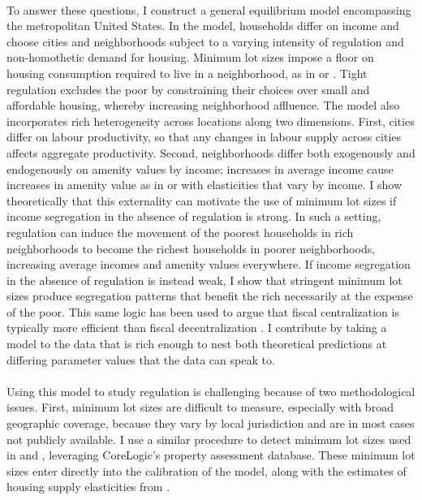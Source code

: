 \documentclass[11pt]{article}
\begin{document}
	\paragraph*{}
	To answer these questions, I construct a general equilibrium model encompassing the metropolitan United States. In the model, households differ on income and choose cities and neighborhoods subject to a varying intensity of regulation and non-homothetic demand for housing. Minimum lot sizes impose a floor on housing consumption required to live in a neighborhood, as in \cite{kulka} or \cite{calabresetal}. Tight regulation excludes the poor by constraining their choices over small and affordable housing, whereby increasing neighborhood affluence. The model also incorporates rich heterogeneity across locations along two dimensions. First, cities differ on labour productivity, so that any changes in labour supply across cities affects aggregate productivity. Second, neighborhoods differ both exogenously and endogenously on amenity values by income; increases in average income cause increases in amenity value as in \citet{parispoor} or \citet{ghh2013} with elasticities that vary by income. I show theoretically that this externality can motivate the use of minimum lot sizes if income segregation in the absence of regulation is strong. In such a setting, regulation can induce the movement of the poorest households in rich neighborhoods to become the richest households in poorer neighborhoods, increasing average incomes and amenity values everywhere. If income segregation in the absence of regulation is instead weak, I show that stringent minimum lot sizes produce segregation patterns that benefit the rich necessarily at the expense of the poor. This same logic has been used to argue that fiscal centralization is typically more efficient than fiscal decentralization \citep{ineffTiebout}. I contribute by taking a model to the data that is rich enough to nest both theoretical predictions at differing parameter values that the data can speak to.
	
	\paragraph*{}
	Using this model to study regulation is challenging because of two methodological issues. First, minimum lot sizes are difficult to measure, especially with broad geographic coverage, because they vary by local jurisdiction and are in most cases not publicly available. I use a similar procedure to detect minimum lot sizes used in \cite{Song} and \cite{Cui}, leveraging CoreLogic's property assessment database. These minimum lot sizes enter directly into the calibration of the model, along with the estimates of housing supply elasticities from \cite{BSH}. 
	 
\end{document}
